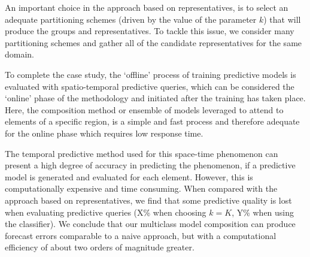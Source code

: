 
An important choice in the approach based on representatives, is to select an adequate partitioning schemes (driven by the value of the parameter $k$) that will produce the groups and representatives. To tackle this issue, we consider many partitioning schemes and gather all of the candidate representatives for the same domain.

To complete the case study, the `offline' process of training predictive models is evaluated with spatio-temporal predictive queries, which can be considered the `online' phase of the methodology and initiated after the training has taken place. Here, the composition method or ensemble of models leveraged to attend to elements of a specific region, is a simple and fast process and therefore adequate for the online phase which requires low response time.

The temporal predictive method used for this space-time phenomenon can present a high degree of accuracy in predicting the phenomenon, if a predictive model is generated and evaluated for each element. However, this is computationally expensive and time consuming. When compared with the approach based on representatives, we find that some predictive quality is lost when evaluating predictive queries (X\% when choosing $k=K$, Y\% when using the classifier). We conclude that our multiclass model composition can produce forecast errors comparable to a naive approach, but with a computational efficiency of about two orders of magnitude greater.

